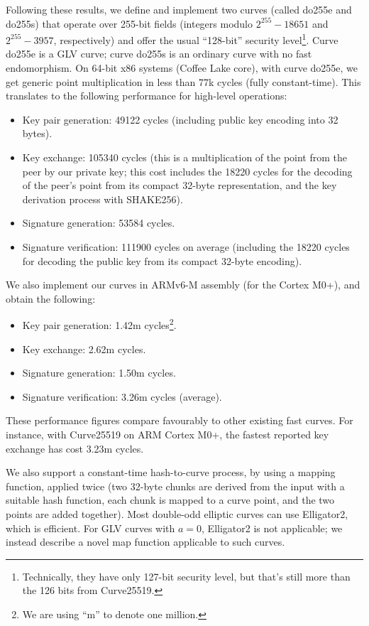 \documentclass{llncs}
\begin{document}
Following these results, we define and implement two curves (called
do255e and do255s) that operate over 255-bit fields (integers modulo
$2^{255}-18651$ and $2^{255}-3957$, respectively) and offer the usual
``128-bit'' security level\footnote{Technically, they have only 127-bit
security level, but that's still more than the 126 bits from
Curve25519.}. Curve do255e is a GLV curve; curve do255s is an ordinary
curve with no fast endomorphism. On 64-bit x86 systems (Coffee Lake core),
with curve do255e, we get generic point multiplication in less than
77k cycles (fully constant-time). This translates to the following
performance for high-level operations:
\begin{itemize}
    \item Key pair generation: 49122 cycles (including public key
    encoding into 32 bytes).
    \item Key exchange: 105340 cycles (this is a multiplication of the
    point from the peer by our private key; this cost includes the 18220
    cycles for the decoding of the peer's point from its compact 32-byte
    representation, and the key derivation process with SHAKE256).
    \item Signature generation: 53584 cycles.
    \item Signature verification: 111900 cycles on average (including
    the 18220 cycles for decoding the public key from its compact
    32-byte encoding).
\end{itemize}
We also implement our curves in ARMv6-M assembly (for the Cortex M0+),
and obtain the following:
\begin{itemize}
    \item Key pair generation: 1.42m cycles\footnote{We are using ``m''
    to denote one million.}.
    \item Key exchange: 2.62m cycles.
    \item Signature generation: 1.50m cycles.
    \item Signature verification: 3.26m cycles (average).
\end{itemize}
These performance figures compare favourably to other existing fast
curves. For instance, with Curve25519 on ARM Cortex M0+, the fastest
reported key exchange has cost 3.23m cycles\cite{Por2020-4}.

We also support a constant-time hash-to-curve process, by using a
mapping function, applied twice (two 32-byte chunks are derived from the
input with a suitable hash function, each chunk is mapped to a curve
point, and the two points are added together). Most double-odd elliptic
curves can use Elligator2\cite{BerHamKraLan2013}, which is efficient.
For GLV curves with $a = 0$, Elligator2 is not applicable; we instead
describe a novel map function applicable to such curves.
\end{document}
